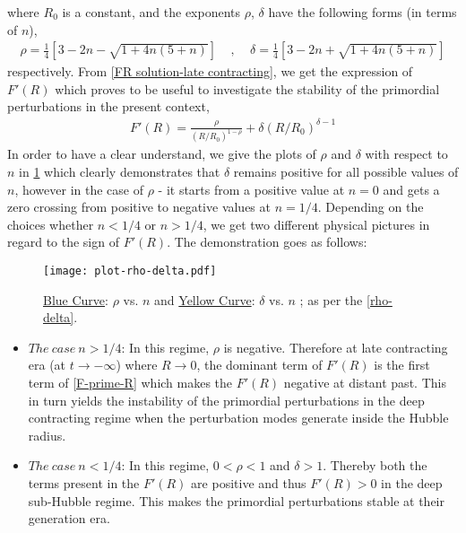\documentclass{article}
\begin{document}
where $R_0$ is a constant, and the exponents $\rho$, $\delta$ have the following forms (in terms of $n$),
\begin{eqnarray}
 \rho = \frac{1}{4}\left[3 - 2n - \sqrt{1 + 4n\left(5+n\right)}\right]~~~~~,~~~~~
 \delta = \frac{1}{4}\left[3 - 2n + \sqrt{1 + 4n\left(5+n\right)}\right]
 \label{rho-delta}
\end{eqnarray}
respectively. From \ref{FR solution-late contracting}, we get the expression of $F'(R)$ which proves to be useful 
to investigate the stability of the primordial perturbations in the present context,
\begin{eqnarray}
F'(R) = \frac{\rho}{\left(R/R_0\right)^{1-\rho}} + \delta \left(R/R_0\right)^{\delta-1}
 \label{F-prime-R}
\end{eqnarray}
In order to have a clear understand, we give the plots of $\rho$ and $\delta$ with respect to $n$ in \ref{plot-rho-delta} which
clearly demonstrates that $\delta$ remains positive for all possible values of $n$, however in the case of $\rho$ - it 
starts from a positive value at $n = 0$ and gets a zero crossing from positive to negative values at $n = 1/4$. Depending on the choices whether 
$n < 1/4$ or $n > 1/4$, we get two different physical pictures in regard to the sign of $F'(R)$. The demonstration goes as follows:

\begin{figure}[!h]
\begin{center}
 \centering
 \texttt{[image: plot-rho-delta.pdf]}
 \caption{{\underline{Blue Curve}}: $\rho$ vs. $n$ and {\underline{Yellow Curve}}: $\delta$ vs. $n$ ; as per the \ref{rho-delta}.}
 \label{plot-rho-delta}
\end{center}
\end{figure}

\begin{itemize}
 \item $The~case~n > 1/4$: In this regime, $\rho$ is negative. Therefore at late contracting era (at $t \rightarrow -\infty$) where 
 $R \rightarrow 0$, the dominant term of $F'(R)$ is the first term of \ref{F-prime-R} which makes the $F'(R)$ negative at distant past. This in turn 
 yields the instability of the primordial perturbations in the deep contracting regime when the perturbation modes generate inside the Hubble radius.
 
 \item $The~case~n < 1/4$: In this regime, $0 < \rho < 1$ and $\delta > 1$. Thereby both the terms present in the $F'(R)$ are positive 
 and thus $F'(R) > 0$ in the deep sub-Hubble regime. This makes the primordial perturbations stable at their generation era.
\end{itemize}
\end{document}
